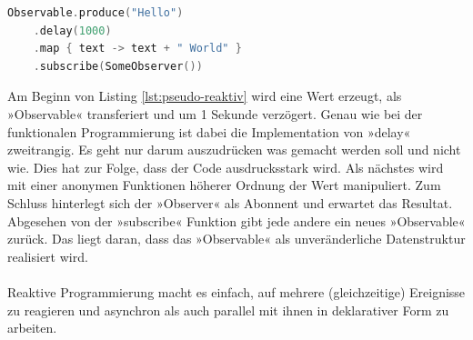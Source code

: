 \begin{lstlisting}[caption={Pseudocode reaktive Programmierung}, label={lst:pseudo-reaktiv}, language=Kotlin]
Observable.produce("Hello")
	.delay(1000)
	.map { text -> text + " World" }
	.subscribe(SomeObserver())
\end{lstlisting}
\bigskip
Am Beginn von Listing 
\ref{lst:pseudo-reaktiv}
wird eine Wert erzeugt, als »Observable« transferiert und um 1 Sekunde verzögert. Genau wie bei der funktionalen Programmierung ist dabei die Implementation von »delay« zweitrangig. Es geht nur darum auszudrücken was gemacht werden soll und nicht wie. Dies hat zur Folge, dass der Code ausdrucksstark wird. Als nächstes wird mit einer anonymen Funktionen höherer Ordnung der Wert manipuliert. Zum Schluss hinterlegt sich der »Observer« als Abonnent und erwartet das Resultat. Abgesehen von der »subscribe« Funktion gibt jede andere ein neues »Observable« zurück. Das liegt daran, dass das »Observable« als unveränderliche Datenstruktur realisiert wird.
\\\\
Reaktive Programmierung macht es einfach, auf mehrere (gleichzeitige) Ereignisse zu reagieren und asynchron als auch parallel mit ihnen in deklarativer Form zu arbeiten. 


